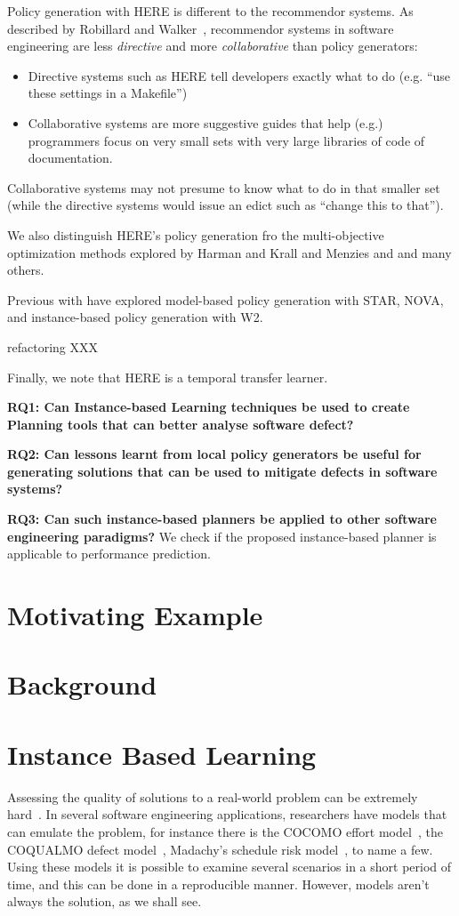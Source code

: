 \documentclass[conference]{IEEEtran}
\newcommand{\bi}{\begin{itemize}}
\newcommand{\ei}{\end{itemize}}
\begin{document}
Policy generation with HERE is different to the recommendor systems.
As described by Robillard and Walker~\cite{rob14}, recommendor systems
in software engineering
are less {\em directive} and more    {\em collaborative} than policy
generators:
\bi
\item
Directive systems such as HERE tell developers exactly what to do
(e.g. ``use these settings in a Makefile'') 
\item
Collaborative systems are more suggestive guides that
help (e.g.) programmers focus on very small sets
with  very large libraries of code of documentation.
\ei
Collaborative systems may not presume to know what to do
in that smaller set (while the directive systems would issue an edict
such as  ``change this to that'').

We also distinguish HERE's policy generation fro the multi-objective optimization methods explored by Harman and Krall and Menzies and 
and many others.



Previous with have explored model-based policy generation with STAR,
NOVA, and instance-based policy generation with  W2.

refactoring XXX

Finally, we note that HERE is a temporal transfer learner.


{\bf RQ1: Can Instance-based Learning techniques be used to create Planning tools that can better analyse software defect?} 


{\bf RQ2: Can lessons learnt from local policy generators be useful for generating solutions that can be used to mitigate defects in software systems?} 

{\bf RQ3: Can such instance-based planners be applied to other software engineering paradigms?}
We check if the proposed instance-based planner is applicable to performance prediction.

\section{Motivating Example}
\section{Background}
\section{Instance Based Learning}

Assessing the quality of solutions to a real-world problem can be extremely hard~\cite{menzies2005xomo}. In several software engineering applications, researchers have models that can emulate the problem, for instance there is the COCOMO effort model~\cite[p29-57]{boehm2009software}, the COQUALMO defect model~\cite[p254-268]{boehm2009software}, Madachy’s schedule risk model~\cite[p284-291]{boehm2009software}, to name a few. Using these models it is possible to examine several scenarios in a short period of time, and this can be done in a reproducible manner. However, models aren't always the solution, as we shall see. 
\end{document}
